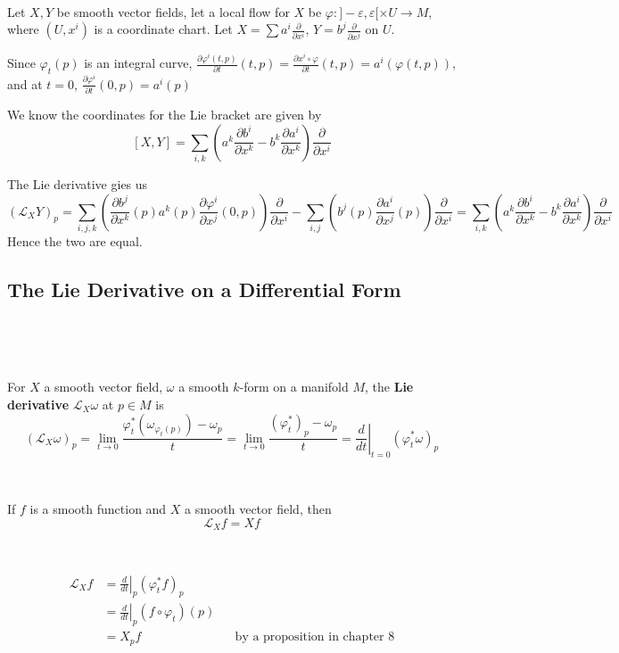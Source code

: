 \documentclass{article}
\begin{document}
\begin{customproof}
  \

Let $X,Y$ be smooth vector fields, let a local flow for $X$ be $\varphi: ]-\varepsilon, \varepsilon[ \times U \to M$, where $(U, x^i)$ is a coordinate chart. Let $X = \sum a^i \frac{\partial}{\partial x^i}$, $Y = b^j \frac{\partial}{\partial x^j}$ on $U$.

  Since $\varphi_t(p)$ is an integral curve, $\frac{\partial \varphi^i(t,p)}{\partial t}(t,p) = \frac{\partial x^i \circ \varphi}{\partial t}(t,p) = a^i(\varphi(t,p))$, and at $t=0$, $\frac{\partial \varphi^i}{\partial t}(0,p) = a^i(p)$

  We know the coordinates for the Lie bracket are given by $$[X,Y] = \sum_{i,k}(a^k \frac{\partial b^i}{\partial x^k} - b^k \frac{\partial a^i}{\partial x^k})\frac{\partial}{\partial x^i}$$

  The Lie derivative gies us $$(\mathcal{L}_XY)_p = \sum_{i,j,k}(\frac{\partial b^j}{\partial x^k}(p)a^k(p)\frac{\partial \varphi^i}{\partial x^j}(0,p))\frac{\partial}{\partial x^i} - \sum_{i,j} (b^j(p)\frac{\partial a^i}{\partial x^j}(p))\frac{\partial}{\partial x^i} = \sum_{i,k}(a^k \frac{\partial b^i}{\partial x^k} - b^k \frac{\partial a^i}{\partial x^k})\frac{\partial}{\partial x^i}$$Hence the two are equal.
\end{customproof}

\subsection{The Lie Derivative on a Differential Form}
\

\begin{definition}
  \

  For $X$ a smooth vector field, $\omega$ a smooth $k$-form on a manifold $M$, the \textbf{Lie derivative} $\mathcal{L}_X\omega$ at $p \in M$ is $$(\mathcal{L}_X\omega)_p = \lim_{t \to 0} \frac{\varphi_t^*(\omega_{\varphi_t(p)}) - \omega_p}{t} = \lim_{t \to 0} \frac{(\varphi_t^*)_p - \omega_p}{t} = \left.\frac{d}{dt}\right\vert_{t=0}(\varphi_t^*\omega)_p$$
\end{definition}

\begin{proposition}
  \

  If $f$ is a smooth function and $X$ a smooth vector field, then $$\mathcal{L}_Xf = Xf$$
\end{proposition}

\begin{customproof}
  \

  \begin{align*}
    \mathcal{L}_Xf &= \left.\frac{d}{dt}\right\vert_p (\varphi_t^* f)_p \\
    &= \left.\frac{d}{dt}\right\vert_p (f \circ \varphi_t)(p)\\
    &= X_pf && \text{by a proposition in chapter 8}
  \end{align*}
\end{customproof}
\end{document}
